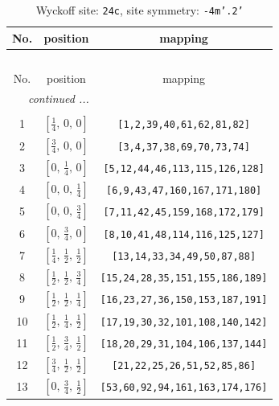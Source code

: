 \documentclass[fleqn,8pt]{jsarticle}
\begin{document}
\begin{longtable}{ccc}
\caption{Wyckoff site: {\tt 24c}, site symmetry: {\tt -4m'.2'}}
 \\
 \hline \hline
No. & position & mapping \\ \hline \endfirsthead

\multicolumn{2}{l}{\tablename\ \thetable{}} \\
 \hline \hline
No. & position & mapping \\ \hline \endhead

 \hline \hline
\multicolumn{2}{r}{\footnotesize\it continued ...} \\ \endfoot

 \hline \hline
\multicolumn{2}{r}{} \\ \endlastfoot

1 & $\left[ \frac{1}{4},\, 0,\, 0 \right]$ & {\tt [1,2,39,40,61,62,81,82]} \\ \hline
2 & $\left[ \frac{3}{4},\, 0,\, 0 \right]$ & {\tt [3,4,37,38,69,70,73,74]} \\ \hline
3 & $\left[ 0,\, \frac{1}{4},\, 0 \right]$ & {\tt [5,12,44,46,113,115,126,128]} \\ \hline
4 & $\left[ 0,\, 0,\, \frac{1}{4} \right]$ & {\tt [6,9,43,47,160,167,171,180]} \\ \hline
5 & $\left[ 0,\, 0,\, \frac{3}{4} \right]$ & {\tt [7,11,42,45,159,168,172,179]} \\ \hline
6 & $\left[ 0,\, \frac{3}{4},\, 0 \right]$ & {\tt [8,10,41,48,114,116,125,127]} \\ \hline
7 & $\left[ \frac{1}{4},\, \frac{1}{2},\, \frac{1}{2} \right]$ & {\tt [13,14,33,34,49,50,87,88]} \\ \hline
8 & $\left[ \frac{1}{2},\, \frac{1}{2},\, \frac{3}{4} \right]$ & {\tt [15,24,28,35,151,155,186,189]} \\ \hline
9 & $\left[ \frac{1}{2},\, \frac{1}{2},\, \frac{1}{4} \right]$ & {\tt [16,23,27,36,150,153,187,191]} \\ \hline
10 & $\left[ \frac{1}{2},\, \frac{1}{4},\, \frac{1}{2} \right]$ & {\tt [17,19,30,32,101,108,140,142]} \\ \hline
11 & $\left[ \frac{1}{2},\, \frac{3}{4},\, \frac{1}{2} \right]$ & {\tt [18,20,29,31,104,106,137,144]} \\ \hline
12 & $\left[ \frac{3}{4},\, \frac{1}{2},\, \frac{1}{2} \right]$ & {\tt [21,22,25,26,51,52,85,86]} \\ \hline
13 & $\left[ 0,\, \frac{3}{4},\, \frac{1}{2} \right]$ & {\tt [53,60,92,94,161,163,174,176]} \\ \hline

\end{longtable}
\end{document}
